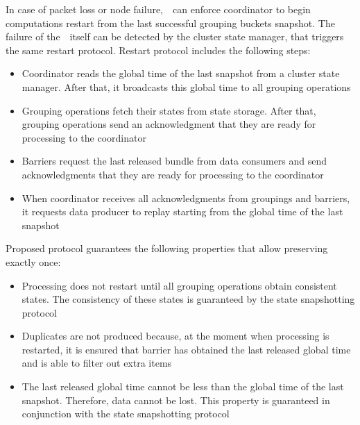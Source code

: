 In case of packet loss or node failure,~\Acker\ can enforce coordinator to begin computations restart from the last successful grouping buckets snapshot. The failure of the~\Acker\ itself can be detected by the cluster state manager, that triggers the same restart protocol. Restart protocol includes the following steps:

\begin{itemize}
    \item Coordinator reads the global time of the last snapshot from a cluster state manager. After that, it broadcasts this global time to all grouping operations
    \item Grouping operations fetch their states from state storage. After that, grouping operations send an acknowledgment that they are ready for processing to the coordinator 
    \item Barriers request the last released bundle from data consumers and send acknowledgments that they are ready for processing to the coordinator
    \item When coordinator receives all acknowledgments from groupings and barriers, it requests data producer to replay starting from the global time of the last snapshot  
\end{itemize}

Proposed protocol guarantees the following properties that allow preserving exactly once:

\begin{itemize}
    \item Processing does not restart until all grouping operations obtain consistent states. The consistency of these states is guaranteed by the state snapshotting protocol
    \item Duplicates are not produced because, at the moment when processing is restarted, it is ensured that barrier has obtained the last released global time and is able to filter out extra items
    \item The last released global time cannot be less than the global time of the last snapshot. Therefore, data cannot be lost. This property is guaranteed in conjunction with the state snapshotting protocol
\end{itemize}